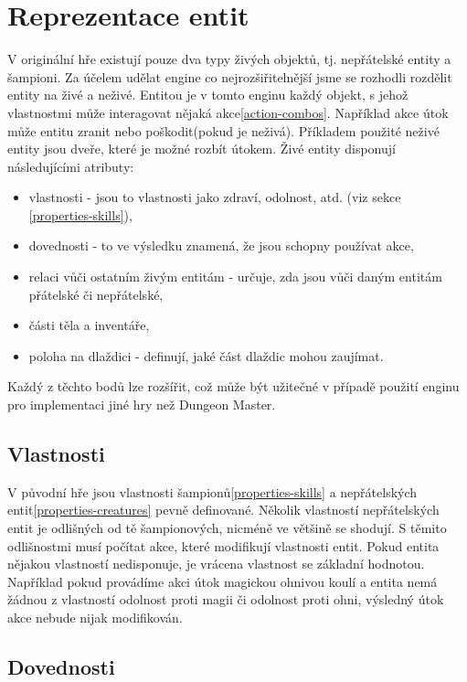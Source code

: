 \section{Reprezentace entit}

V originální hře existují pouze dva typy živých objektů, tj. nepřátelské entity a šampioni. Za účelem udělat engine
co nejrozšiřitelnější jsme se rozhodli rozdělit entity na živé a neživé.   
Entitou je v tomto enginu každý objekt, s jehož vlastnostmi může interagovat nějaká akce\vref{action-combos}.
Například akce útok může entitu zranit nebo poškodit(pokud je neživá). Příkladem použité neživé entity 
jsou dveře, které je možné rozbít útokem. Živé entity disponují následujícími atributy:

\begin{itemize}
\item vlastnosti - jsou to vlastnosti jako zdraví, odolnost,  atd. (viz sekce \ref{properties-skills}),
\item dovednosti - to ve výsledku znamená, že jsou schopny používat akce,
\item relaci vůči ostatním živým entitám - určuje, zda jsou vůči daným entitám přátelské či nepřátelské,
\item části těla a inventáře,
\item poloha na dlaždici - definují, jaké část dlaždic mohou zaujímat.
\end{itemize}

Každý z těchto bodů lze rozšířit, což může být užitečné v případě použití enginu pro implementaci jiné hry než Dungeon Master. 

\subsection{Vlastnosti}\label{entity-properties}

V původní hře jsou vlastnosti šampionů\vref{properties-skills} a nepřátelských entit\vref{properties-creatures} pevně definované. 
Několik vlastností nepřátelských entit je odlišných od tě šampionových, nicméně ve většině se shodují.
S těmito odlišnostmi musí počítat akce, které modifikují vlastnosti entit. Pokud entita nějakou vlastností nedisponuje, je vrácena 
vlastnost se základní hodnotou. Například pokud provádíme akci útok magickou ohnivou koulí a entita nemá žádnou z vlastností
odolnost proti magii či odolnost proti ohni, výsledný útok akce nebude nijak modifikován. 

 \subsection{Dovednosti}

